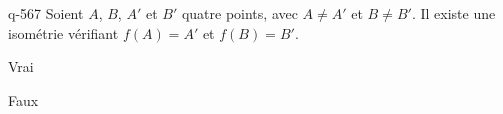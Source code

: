 \begin{truefalse}{q-567}
Soient $A$, $B$, $A'$ et $B'$  quatre points, avec $A\neq A'$ et $B\neq B'$. Il existe une isométrie vérifiant $f(A)=A'$ et $f(B)=B'$.
\item Vrai
\item* Faux
\end{truefalse}

